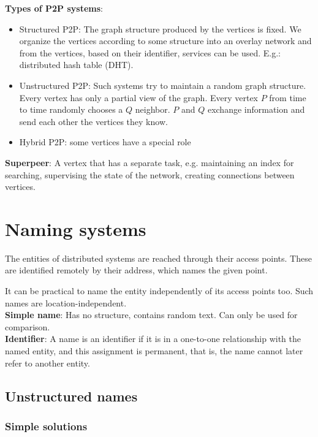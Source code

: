 \documentclass[margin=0px]{article}
\begin{document}
\noindent \textbf{Types of P2P systems}:
\begin{itemize}
    \item	Structured P2P: The graph structure produced by the vertices is fixed. We organize the vertices according to some structure
          into an overlay network and from the vertices, based on their identifier, services can be
          used. E.g.: distributed hash table (DHT).

    \item	Unstructured P2P: Such systems try to maintain a random graph structure. Every
          vertex has only a partial view of the graph. Every vertex $P$ from time to time randomly chooses a $Q$
          neighbor. $P$ and $Q$ exchange information and send each other the vertices they know.

    \item	Hybrid P2P: some vertices have a special role
\end{itemize}

\noindent \textbf{Superpeer}: A vertex that has a separate task, e.g. maintaining an index for searching, supervising the state of the network,
creating connections between vertices.

\section{Naming systems}

The entities of distributed systems are reached through their access points. These are identified remotely by
their address, which names the given point.

It can be practical to name the entity independently of its access points too. Such names are location-independent.\\

\noindent \textbf{Simple name}: Has no structure, contains random text. Can only be used for comparison.\\

\noindent \textbf{Identifier}: A name is an identifier if it is in a one-to-one relationship with the named entity, and this
assignment is permanent, that is, the name cannot later refer to another entity.

\subsection{Unstructured names}

\subsubsection{Simple solutions}
\end{document}

